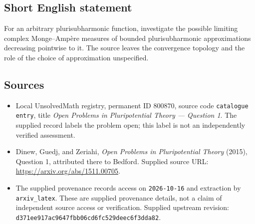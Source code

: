 \documentclass[11pt]{article}
\begin{document}
\subsection{Short English statement}
For an arbitrary plurisubharmonic function, investigate the possible limiting complex Monge--Amp\`ere measures of bounded plurisubharmonic approximations decreasing pointwise to it. The source leaves the convergence topology and the role of the choice of approximation unspecified.
\subsection{Sources}
\begin{itemize}
\item Local UnsolvedMath registry, permanent ID \(800870\), source code \texttt{catalogue entry}, title \emph{Open Problems in Pluripotential Theory --- Question 1}. The supplied record labels the problem open; this label is not an independently verified assessment.
\item Dinew, Guedj, and Zeriahi, \emph{Open Problems in Pluripotential Theory} (2015), Question 1, attributed there to Bedford. Supplied source URL: \url{https://arxiv.org/abs/1511.00705}.
\item The supplied provenance records access on \texttt{2026-10-16} and extraction by \texttt{arxiv\_latex}. These are supplied provenance details, not a claim of independent source access or verification. Supplied upstream revision: \texttt{d371ee917ac9647fbb06cd6fc529deec6f3dda82}.
\end{itemize}
\end{document}
